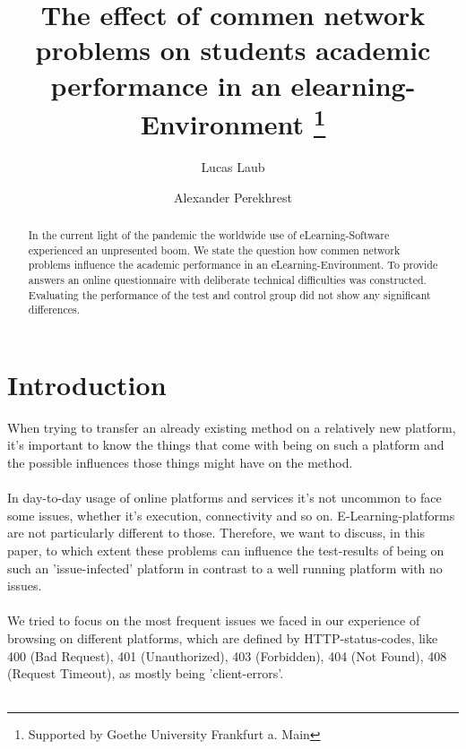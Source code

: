 \documentclass[runningheads]{llncs}
\begin{document}
\title{The effect of commen network problems on students academic performance in an elearning-Environment
\thanks{Supported by Goethe University Frankfurt a. Main}}

\author{Lucas Laub \and
Alexander Perekhrest }


\maketitle


\begin{abstract}
In the current light of the pandemic the worldwide use
of eLearning-Software experienced an unpresented boom.
We state the question how commen network problems influence
the academic performance in an eLearning-Environment.
To provide answers an online questionnaire with deliberate
technical difficulties was constructed. Evaluating the performance
of the test and control group did not show any significant
differences.
\end{abstract}

\section{Introduction}
When trying to transfer an already existing method on a relatively new platform, 
it's important to know the things that come with being on such a platform and the 
possible influences those things might have on the method.\\\\

In day-to-day usage of online platforms and services it's not uncommon to face some 
issues, whether it's execution, connectivity and so on. E-Learning-platforms are not 
particularly different to those. Therefore, we want to discuss, in this paper, to 
which extent these problems can influence the test-results of being on such an 
'issue-infected' platform in contrast to a well running platform with no issues.\\\\

We tried to focus on the most frequent issues we faced in our experience of browsing 
on different platforms, which are defined by HTTP-status-codes, like 400 (Bad Request), 401 
(Unauthorized), 403 (Forbidden), 404 (Not Found), 408 (Request Timeout), as mostly being 'client-errors'.\\\\
\newpage
\end{document}
